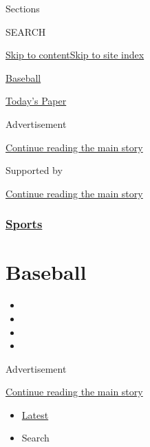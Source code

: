 Sections

SEARCH

\protect\hyperlink{site-content}{Skip to
content}\protect\hyperlink{site-index}{Skip to site index}

\href{https://www.nytimes3xbfgragh.onion/section/sports/baseball}{Baseball}

\href{https://myaccount.nytimes3xbfgragh.onion/auth/login?response_type=cookie\&client_id=vi}{}

\href{https://www.nytimes3xbfgragh.onion/section/todayspaper}{Today's
Paper}

Advertisement

\protect\hyperlink{after-top}{Continue reading the main story}

Supported by

\protect\hyperlink{after-sponsor}{Continue reading the main story}

\hypertarget{sports}{%
\subsubsection{\texorpdfstring{\href{/section/sports}{Sports}}{Sports}}\label{sports}}

\hypertarget{baseball}{%
\section{Baseball}\label{baseball}}

\begin{itemize}
\item
\item
\item
\item
\end{itemize}

Advertisement

\protect\hyperlink{after-subheader}{Continue reading the main story}

\begin{itemize}
\tightlist
\item
  \protect\hyperlink{stream-panel}{Latest}
\item
  Search
\end{itemize}

